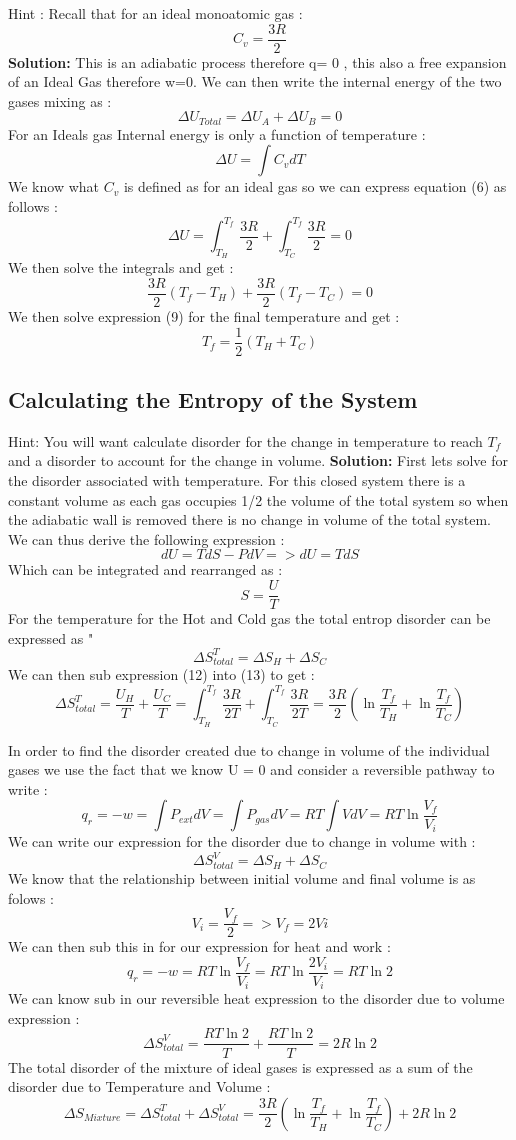 \documentclass{article}
\newcommand{\be}{\begin{equation}}
\newcommand{\ee}{\end{equation}}
\begin{document}
Hint : Recall that for an ideal monoatomic gas : 
\be
C_v = \frac{3R}{2}
\ee
\textbf{Solution:}
 This is an adiabatic process therefore q= 0 , this also a free expansion of an Ideal Gas therefore w=0.  
We can then write the internal energy of the two gases mixing as : 
\be
\Delta U_{Total}=\Delta U_{A} + \Delta U_{B} = 0 
\ee
For an Ideals gas Internal energy is only a function of temperature : 
\be
\Delta U = \int C_v dT
\ee
We know what $C_v$ is defined as for an ideal gas so we can express equation (6) as follows : 
\be
\Delta U = \int ^{T_f}_{T_H} \frac{3R}{2} + \int ^{T_f}_{T_C} \frac{3R}{2} = 0  
\ee
We then solve the integrals and get : 
\be
\frac{3R}{2}({T_f}-{T_H})  + \frac{3R}{2}({T_f}-{T_C}) = 0 
\ee
We then solve expression (9) for the final temperature and get : 
\be
T_f = \frac{1}{2}(T_H + T_C )
\ee

\subsection{Calculating the Entropy of the System}
Hint: You will want calculate disorder for the change in temperature to reach $T_f$ and a disorder to account for the change in volume. 
\textbf{Solution:}
First lets solve for the disorder associated with temperature. 
For this closed system there is a constant volume as each gas occupies 1/2 the volume of the total system so when the adiabatic wall is removed there is no change in volume of the total system. 
We can thus derive the following expression : 
\be
dU=TdS -PdV => dU=TdS 
\ee
Which can be integrated and rearranged as : 
\be
S= \frac{U}{T}
\ee
For the temperature for the Hot and Cold gas the total entrop disorder can be expressed as " 
\be
\Delta S^T_{total} = \Delta S_{H} + \Delta S_{C}
\ee
We can then sub expression (12) into (13) to get : 
\be
\Delta S^T_{total} = \frac{U_H}{T} + \frac{U_C}{T} = \int^{T_f}_{T_H}{\frac{3R}{2T}} + \int^{T_f}_{T_C}{\frac{3R}{2T}} = \frac{3R}{2} (\ln\frac{T_f}{T_H} + \ln\frac{T_f}{T_C})
\ee 

In order to find the disorder created due to change in volume of the individual gases we use the fact that we know U = 0 and consider a reversible pathway to write : 
\be
q_r= -w = \int P_{ext}dV = \int P_{gas}dV = RT \int VdV = RT \ln\frac{V_f}{V_i}
\ee
We can write our expression for the disorder due to change in volume with : 
\be
\Delta S^V_{total} = \Delta S_H + \Delta S_C 
\ee
We know that the relationship between initial volume and final volume is as folows : 
\be
V_i = \frac{V_f}{2} => V_f = 2Vi 
\ee
We can then sub this in for our expression for heat and work : 
\be
q_r = -w = RT \ln\frac{V_f}{V_i} = RT \ln\frac{2V_i}{V_i} = RT \ln 2 
\ee
We can know sub in our reversible heat expression to the disorder due to volume expression : 
\be
\Delta S^V_{total} = \frac{RT \ln 2}{T} + \frac{RT \ln 2}{T} = 2R \ln 2
\ee
The total disorder of the mixture of ideal gases is expressed as a sum of the disorder due to Temperature and Volume : 
\be
\Delta S_{Mixture} = \Delta S^T_{total} + \Delta S^V_{total} = \frac{3R}{2} (\ln\frac{T_f}{T_H} + \ln\frac{T_f}{T_C}) + 2R \ln 2
\ee
\end{document}
